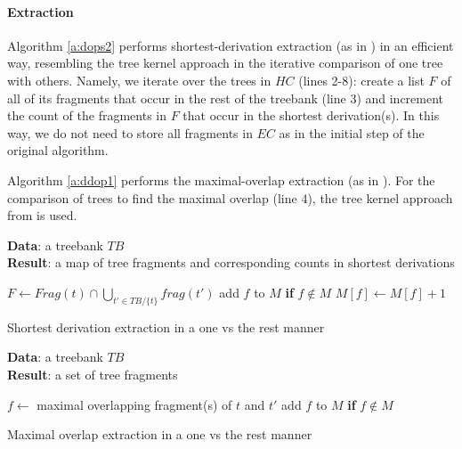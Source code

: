 \paragraph{Extraction}
Algorithm \ref{a:dops2} performs shortest-derivation extraction (as in \dops{}) in an efficient way, resembling the tree kernel approach in the iterative comparison of one tree with others. Namely, we iterate over the trees in $HC$ (lines 2-8): create a list $F$ of all of its fragments that occur in the rest of the treebank (line 3) and increment the count of the fragments in $F$ that occur in the shortest derivation(s). In this way, we do not need to store all fragments in $EC$ as in the initial step of the original \dops{} algorithm. 

Algorithm \ref{a:ddop1} performs the maximal-overlap extraction (as in \ddop{}). For the comparison of trees to find the maximal overlap (line 4), the tree kernel approach from \cite{sangati2011} is used. 

\begin{algorithm}
{\bf Data}: a treebank $TB$\\
{\bf Result}: a map of tree fragments and corresponding counts in shortest derivations\\
\begin{algorithmic}[1]
	\State $F \gets Frag(t)\cap \bigcup\limits_{t'\in TB/\{t\}} frag(t')$
		\State add $f$ to $M$ {\bf if} $f\not\in M$
		\State $M[f]\gets M[f]+1$ 
	\EndFor
\EndFor
\end{algorithmic}
\caption{Shortest derivation extraction in a one vs the rest manner}
\label{a:dops2}
\end{algorithm}


\begin{algorithm}
{\bf Data}: a treebank $TB$\\
{\bf Result}: a set of tree fragments\\
\begin{algorithmic}[1]
		\State $f\gets$ maximal overlapping fragment(s) of $t$ and $t'$
		\State add $f$ to $M$ {\bf if} $f\not\in M$
	\EndFor
\EndFor
\end{algorithmic}



\caption{Maximal overlap extraction in a one vs the rest manner}
\label{a:ddop1}
\end{algorithm}

